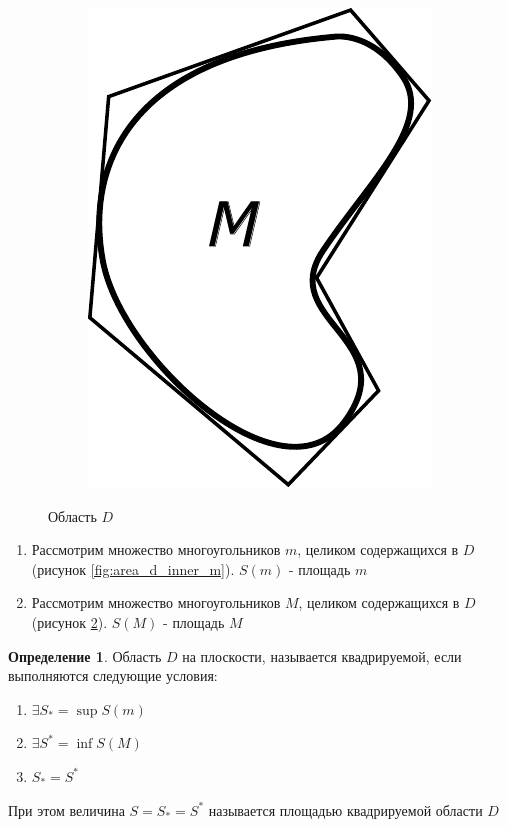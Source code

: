 \documentclass[a4paper, 14pt]{report}
\theoremstyle{definition}
\newtheorem*{definition}{Определение}
\begin{document}
\begin{figure}[!htp]
\begin{subfigure}{0.20\linewidth}
				\includegraphics[width=1\linewidth]{sampleD_bigM}
				\caption{}
				\label{fig:area_d_outer_m}
			\end{subfigure}
			\caption{Область $D$}
		\end{figure}
		
		\begin{enumerate}
			\item Рассмотрим множество многоугольников $m$, целиком содержащихся в $D$
			(рисунок \ref{fig:area_d_inner_m}).
			$S(m)$ - площадь $m$
			
			\item Рассмотрим множество многоугольников $M$, целиком содержащихся в $D$
			(рисунок \ref{fig:area_d_outer_m}).
			$S(M)$ - площадь $M$
		\end{enumerate}
	
		\begin{definition}
			Область $D$ на плоскости, называется квадрируемой, если выполняются следующие условия:
			\begin{enumerate}
				\item $\exists S_*=\sup S(m)$
				\item $\exists S^*=\inf S(M)$
				\item $S_*=S^*$
			\end{enumerate}
		
			При этом величина $S=S_*=S^*$ называется площадью квадрируемой области $D$
		\end{definition}
	
\end{document}
